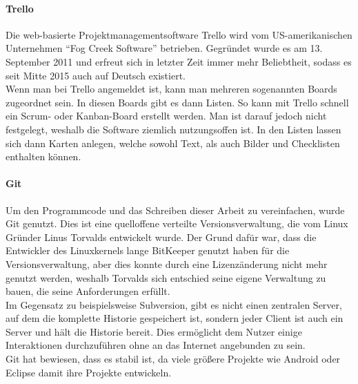   \paragraph{Trello}
  Die web-basierte Projekt\-management\-software Trello wird vom US-amerikanischen Unternehmen
  ``Fog Creek Software'' betrieben. Gegründet wurde es am 13. September 2011 und erfreut sich  in
  letzter Zeit immer mehr Beliebtheit, sodass es seit Mitte 2015 auch auf Deutsch existiert. \\
  Wenn man bei Trello angemeldet ist, kann man mehreren sogenannten Boards zugeordnet sein. In
  diesen Boards gibt es dann Listen. So kann mit Trello schnell ein Scrum- oder Kanban-Board
  erstellt werden. Man ist darauf jedoch nicht festgelegt, weshalb die Software ziemlich
  nutzungsoffen ist. In den Listen lassen sich dann Karten anlegen, welche sowohl Text, als auch
  Bilder und Checklisten enthalten können.

  \paragraph{Git}
  Um den Programmcode und das Schreiben dieser Arbeit zu vereinfachen, wurde Git genutzt. Dies ist
  eine quelloffene verteilte Versionsverwaltung, die vom Linux Gründer Linus Torvalds entwickelt
  wurde. Der Grund dafür war, dass die Entwickler des Linuxkernels lange BitKeeper genutzt haben
  für die Versionsverwaltung, aber dies konnte durch eine Lizenzänderung nicht mehr genutzt werden,
  weshalb Torvalds sich entschied seine eigene Verwaltung zu bauen, die seine Anforderungen erfüllt. \\
  Im Gegensatz zu beispielsweise Subversion, gibt es nicht einen zentralen Server, auf dem die komplette
  Historie gespeichert ist, sondern jeder Client ist auch ein Server und hält die Historie bereit. Dies
  ermöglicht dem Nutzer einige Interaktionen durchzuführen ohne an das Internet angebunden zu sein. \\
  Git hat bewiesen, dass es stabil ist, da viele größere Projekte wie Android oder Eclipse damit ihre
  Projekte entwickeln.

